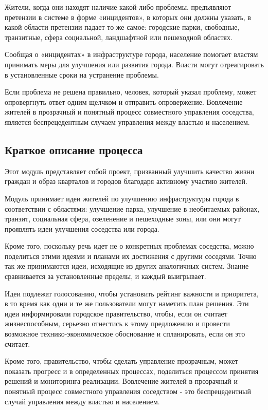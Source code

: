 Жители, когда они находят наличие какой-либо проблемы, предъявляют претензии в системе в форме «инцидентов», в которых они должны указать, в какой области претензии падает то же самое: городские парки, свободные, транзитные, сфера социальной, ландшафтной или пешеходной областях.

Сообщая о «инцидентах» в инфраструктуре города, население помогает властям принимать меры для улучшения или развития города. Власти могут отреагировать в установленные сроки на устранение проблемы.

Если проблема не решена правильно, человек, который указал проблему, может опровергнуть ответ одним щелчком и отправить опровержение. Вовлечение жителей в прозрачный и понятный процесс совместного управления соседства, является беспрецедентным случаем управления между властью и населением.


\subsection{Краткое описание процесса}

Этот модуль представляет собой проект, призванный улучшить качество жизни граждан и образ кварталов и городов благодаря активному участию жителей.

Модуль принимает идеи жителей по улучшению инфраструктуры города в соответствии с областями: улучшение парка, улучшение в необитаемых районах, транзит, социальная сфера, озеленение и пешеходные зоны, или они могут проявлять идеи улучшения соседства или города.

Кроме того, поскольку речь идет не о конкретных проблемах соседства, можно поделиться этими идеями и планами их достижения с другими соседями. Точно так же принимаются идеи, исходящие из других аналогичных систем. Знание сравнивается за установленные пределы, и каждый выигрывает.

Идеи подлежат голосованию, чтобы установить рейтинг важности и приоритета, в то время как одни и те же пользователи могут наметить план решения. Эти идеи информировали городское правительство, чтобы, если он считает жизнеспособным, серьезно отнестись к этому предложению и провести возможное технико-экономическое обоснование и спланировать, если он это считает.

Кроме того, правительство, чтобы сделать управление прозрачным, может показать прогресс и в определенных процессах, поделиться процессом принятия решений и мониторинга реализации. Вовлечение жителей в прозрачный и понятный процесс совместного управления соседством - это беспрецедентный случай управления между властью и населением.


